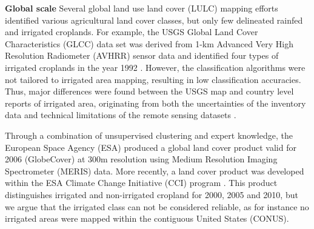 \documentclass[hess, manuscript]{copernicus}
\begin{document}
\textbf{Global scale}
Several global land use land cover (LULC) mapping efforts identified various agricultural land cover classes, but only few delineated rainfed and irrigated croplands. For example, the USGS Global Land Cover Characteristics (GLCC) data set was derived from 1-km Advanced Very High Resolution Radiometer (AVHRR) sensor data and identified four types of irrigated croplands in the year 1992 \citep{loveland2000development}. However, the classification algorithms were not tailored to irrigated area mapping, resulting in low classification accuracies. Thus, major differences were found between the USGS map and country level reports of irrigated area, originating from both the uncertainties of the inventory data and technical limitations of the remote sensing datasets \citep{Voeroesmarty2000}.

Through a combination of unsupervised clustering and expert knowledge, the European Space Agency (ESA) produced a global land cover product valid for 2006 (GlobeCover) at 300m resolution using Medium Resolution Imaging Spectrometer (MERIS) data. More recently, a land cover product was developed within the ESA Climate Change Initiative (CCI) program \citep{bontemps2013consistent}. This product distinguishes irrigated and non-irrigated cropland for 2000, 2005 and 2010, but we argue that the irrigated class can not be considered reliable, as for instance no irrigated areas were mapped within the contiguous United States (CONUS).\\
\end{document}
